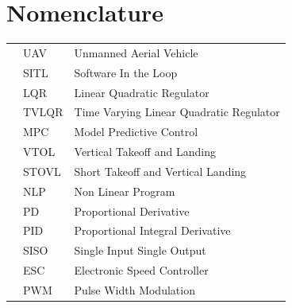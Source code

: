 \chapter*{Nomenclature}

\begin{tabular}{p{0.8cm}p{2.5cm}l}
&UAV		& Unmanned Aerial Vehicle\\
&SITL			&Software In the Loop\\
&LQR		&Linear Quadratic Regulator \\
&TVLQR		&Time Varying Linear Quadratic Regulator\\
&MPC		&Model Predictive Control\\
&VTOL		&Vertical Takeoff and Landing\\
&STOVL		&Short Takeoff and Vertical Landing\\
&NLP		&Non Linear Program\\
&PD			&Proportional Derivative \\
&PID			&Proportional Integral Derivative \\
&SISO		&Single Input Single Output \\
&ESC			& Electronic Speed Controller \\
&PWM		&Pulse Width Modulation \\

\end{tabular}

